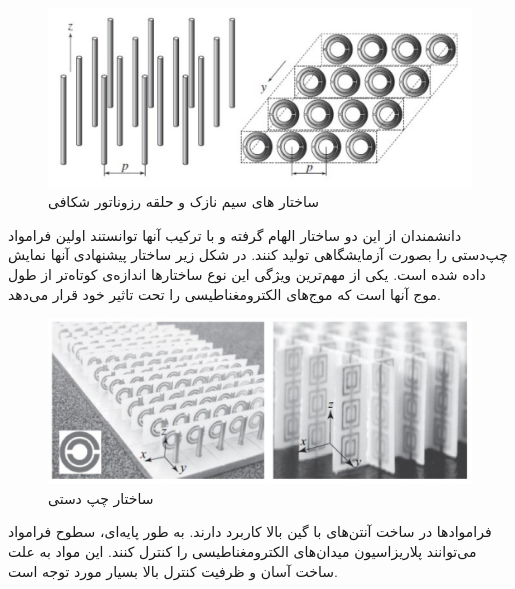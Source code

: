   \begin{figure}
 	\centering
 	\includegraphics[scale=0.5]{Images/fig33.png}
 	\caption{ساختار های سیم نازک و حلقه رزوناتور شکافی}
 	\label{fig33}
 \end{figure}
 
 
 دانشمندان از این دو ساختار الهام گرفته و با ترکیب آنها توانستند اولین فرامواد چپ‌دستی را بصورت آزمایشگاهی تولید کنند. در شکل زیر ساختار پیشنهادی آنها نمایش داده شده است. یکی از مهم‌ترین ویژگی این نوع ساختار‌ها اندازه‌ی کوتاه‌تر از طول موج آنها است که موج‌های الکترومغناطیسی را تحت تاثیر خود قرار می‌دهد.
 
 
\begin{figure}
	\centering
	\includegraphics[scale=0.5]{Images/fig34.png}
	\caption{ساختار چپ دستی}
	\label{fig34}
\end{figure}

فراموادها در ساخت آنتن‌های با گین بالا کاربرد دارند. به طور پایه‌ای، سطوح فرامواد
 می‌توانند پلاریزاسیون میدان‌های الکترومغناطیسی را کنترل کنند.
این مواد به علت ساخت آسان و ظرفیت کنترل بالا بسیار مورد توجه است.

